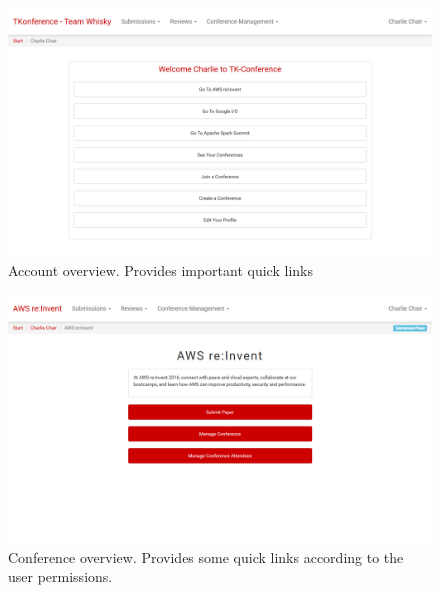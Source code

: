 \documentclass[nochapterpage,nopartpage,noheadingspace,numbersubsubsec,bigchapter,colorback,accentcolor=tud9c,10pt]{tudreport}
\begin{document}
        \begin{figure}[!ht]
            \centering
            \includegraphics[width=\textwidth]{img/ui-account-home}
            \caption{Account overview. Provides important quick links}
            \label{fig:appendix:screenshots:ui-account-home}
        \end{figure}

        \begin{figure}[!ht]
            \centering
            \includegraphics[width=\textwidth]{img/ui-conference-home}
            \caption{Conference overview. Provides some quick links according to the user permissions.}
            \label{fig:appendix:screenshots:ui-conference-home}
        \end{figure}
\end{document}
